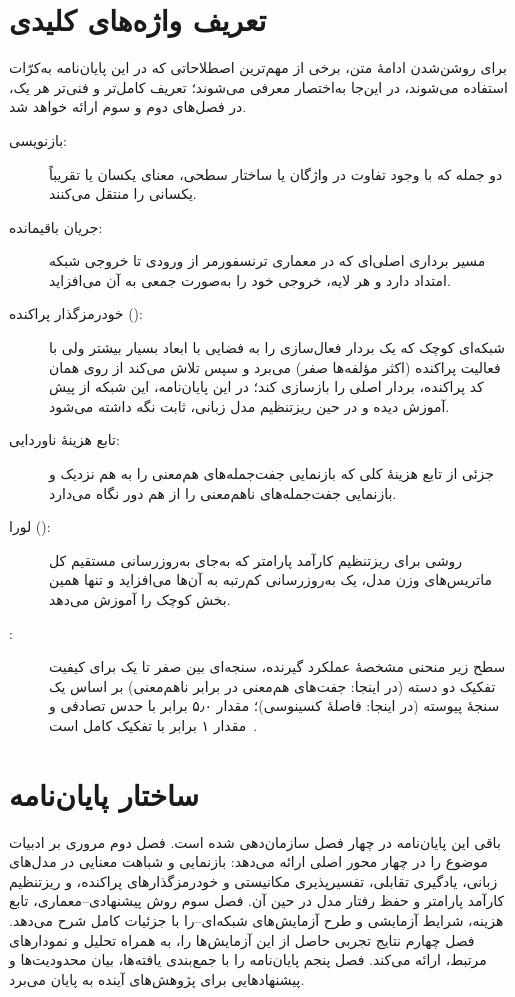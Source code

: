 \section{تعریف واژه‌های کلیدی}
برای روشن‌شدن ادامهٔ متن، برخی از مهم‌ترین اصطلاحاتی که در این پایان‌نامه به‌کرّات استفاده می‌شوند، در این‌جا به‌اختصار معرفی می‌شوند؛ تعریف کامل‌تر و فنی‌تر هر یک، در فصل‌های دوم و سوم ارائه خواهد شد.

\begin{description}
\item[بازنویسی:] دو جمله که با وجود تفاوت در واژگان یا ساختار سطحی، معنای یکسان یا تقریباً یکسانی را منتقل می‌کنند.
\item[جریان باقیمانده:] مسیر برداری اصلی‌ای که در معماری ترنسفورمر از ورودی تا خروجی شبکه امتداد دارد و هر لایه، خروجی خود را به‌صورت جمعی به آن می‌افزاید.
\item[خودرمزگذار پراکنده ():] شبکه‌ای کوچک که یک بردار فعال‌سازی را به فضایی با ابعاد بسیار بیشتر ولی با فعالیت پراکنده (اکثر مؤلفه‌ها صفر) می‌برد و سپس تلاش می‌کند از روی همان کد پراکنده، بردار اصلی را بازسازی کند؛ در این پایان‌نامه، این شبکه از پیش آموزش دیده و در حین ریزتنظیم مدل زبانی، ثابت نگه داشته می‌شود.
\item[تابع هزینهٔ ناوردایی:] جزئی از تابع هزینهٔ کلی که بازنمایی جفت‌جمله‌های هم‌معنی را به هم نزدیک و بازنمایی جفت‌جمله‌های ناهم‌معنی را از هم دور نگاه می‌دارد.
\item[لورا ():] روشی برای ریزتنظیم کارآمد پارامتر که به‌جای به‌روزرسانی مستقیم کل ماتریس‌های وزن مدل، یک به‌روزرسانی کم‌رتبه به آن‌ها می‌افزاید و تنها همین بخش کوچک را آموزش می‌دهد.
\item[:] سطح زیر منحنی مشخصهٔ عملکرد گیرنده، سنجه‌ای بین صفر تا یک برای کیفیت تفکیک دو دسته (در اینجا: جفت‌های هم‌معنی در برابر ناهم‌معنی) بر اساس یک سنجهٔ پیوسته (در اینجا: فاصلهٔ کسینوسی)؛ مقدار ۵٫۰ برابر با حدس تصادفی و مقدار ۱ برابر با تفکیک کامل است~\cite{fawcett2006roc}.
\end{description}

\section{ساختار پایان‌نامه}
باقی این پایان‌نامه در چهار فصل سازمان‌دهی شده است. فصل دوم مروری بر ادبیات موضوع را در چهار محور اصلی ارائه می‌دهد: بازنمایی و شباهت معنایی در مدل‌های زبانی، یادگیری تقابلی، تفسیرپذیری مکانیستی و خودرمزگذارهای پراکنده، و ریزتنظیم کارآمد پارامتر و حفظ رفتار مدل در حین آن. فصل سوم روش پیشنهادی--معماری، تابع هزینه، شرایط آزمایشی و طرح آزمایش‌های شبکه‌ای--را با جزئیات کامل شرح می‌دهد. فصل چهارم نتایج تجربی حاصل از این آزمایش‌ها را، به همراه تحلیل و نمودارهای مرتبط، ارائه می‌کند. فصل پنجم پایان‌نامه را با جمع‌بندی یافته‌ها، بیان محدودیت‌ها و پیشنهادهایی برای پژوهش‌های آینده به پایان می‌برد.
